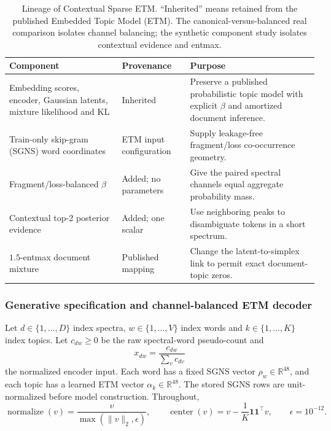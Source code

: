 \documentclass[10pt,a4paper]{article}
\newcommand{\normalize}{\operatorname{normalize}}
\newcommand{\centerop}{\operatorname{center}}
\begin{document}
\begin{table}[H]
\centering
\small
\caption{Lineage of Contextual Sparse ETM. ``Inherited'' means retained from
the published Embedded Topic Model (ETM). The canonical-versus-balanced real
comparison isolates channel balancing; the synthetic component study isolates
contextual evidence and entmax.}
\label{tab:lineage}
\begin{tabular}{@{}>{\raggedright\arraybackslash}p{}
>{\raggedright\arraybackslash}p{}
>{\raggedright\arraybackslash}p{}@{}}
\toprule
Component & Provenance & Purpose \\
\midrule
Embedding scores, encoder, Gaussian latents, mixture likelihood and KL
  & Inherited \cite{dieng2020}
  & Preserve a published probabilistic topic model with explicit $\beta$ and
    amortized document inference. \\
Train-only skip-gram (SGNS) word coordinates
  & ETM input configuration \cite{mikolov2013}
  & Supply leakage-free fragment/loss co-occurrence geometry. \\
Fragment/loss-balanced $\beta$
  & Added; no parameters
  & Give the paired spectral channels equal aggregate probability mass. \\
Contextual top-2 posterior evidence
  & Added; one scalar
  & Use neighboring peaks to disambiguate tokens in a short spectrum. \\
$1.5$-entmax document mixture
  & Published mapping \cite{peters2019}
  & Change the latent-to-simplex link to permit exact document-topic zeros. \\
\bottomrule
\end{tabular}
\end{table}

\subsubsection{Generative specification and channel-balanced ETM decoder}

Let $d\in\{1,\ldots,D\}$ index spectra, $w\in\{1,\ldots,V\}$ index words and
$k\in\{1,\ldots,K\}$ index topics. Let $c_{dw}\geq0$ be the raw spectral-word
pseudo-count and
\begin{equation}
  x_{dw}=\frac{c_{dw}}{\sum_v c_{dv}}
  \label{eq:normalized-bow}
\end{equation}
the normalized encoder input. Each word has a fixed SGNS vector
$\rho_w\in\mathbb R^{48}$, and each topic has a learned ETM vector
$\alpha_k\in\mathbb R^{48}$. The stored SGNS rows are unit-normalized before
model construction. Throughout,
\[
  \normalize(v)=\frac{v}{\max(\lVert v\rVert_2,\epsilon)},\qquad
  \centerop(v)=v-\frac{1}{K}\mathbf 1\mathbf 1^\top v,\qquad
  \epsilon=10^{-12}.
\]
\end{document}
